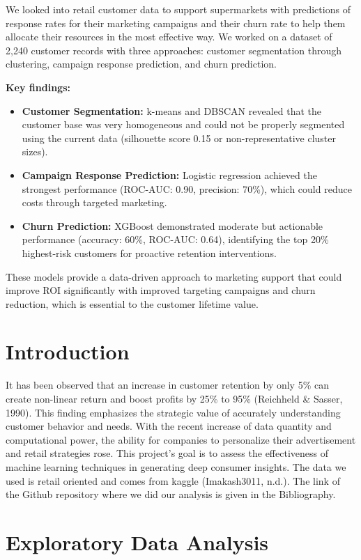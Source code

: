 \documentclass[11pt,a4paper]{article}
\begin{document}
We looked into retail customer data to support supermarkets with predictions of response rates for their marketing campaigns and their churn rate to help them allocate their resources in the most effective way. We worked on a dataset of 2,240 customer records with three approaches: customer segmentation through clustering, campaign response prediction, and churn prediction.

\textbf{Key findings:}
\begin{itemize}
    \item \textbf{Customer Segmentation:} k-means and DBSCAN revealed that the customer base was very homogeneous and could not be properly segmented using the current data (silhouette score 0.15 or non-representative cluster sizes).
    \item \textbf{Campaign Response Prediction:} Logistic regression achieved the strongest performance (ROC-AUC: 0.90, precision: 70\%), which could reduce costs through targeted marketing.
    \item \textbf{Churn Prediction:} XGBoost demonstrated moderate but actionable performance (accuracy: 60\%, ROC-AUC: 0.64), identifying the top 20\% highest-risk customers for proactive retention interventions.
\end{itemize}

These models provide a data-driven approach to marketing support that could improve ROI significantly with improved targeting campaigns and churn reduction, which is essential to the customer lifetime value.


\section{Introduction}
It has been observed that an increase in customer retention by only 5\% can create non-linear
return and boost profits by 25\% to 95\% (Reichheld \& Sasser, 1990). This finding emphasizes
the strategic value of accurately understanding customer behavior and needs. With the recent
increase of data quantity and computational power, the ability for companies to personalize
their advertisement and retail strategies rose. This project’s goal is to assess the effectiveness
of machine learning techniques in generating deep consumer insights. The data we used is
retail oriented and comes from kaggle (Imakash3011, n.d.). The link of the Github repository
where we did our analysis is given in the Bibliography.

\section{Exploratory Data Analysis}
\end{document}

